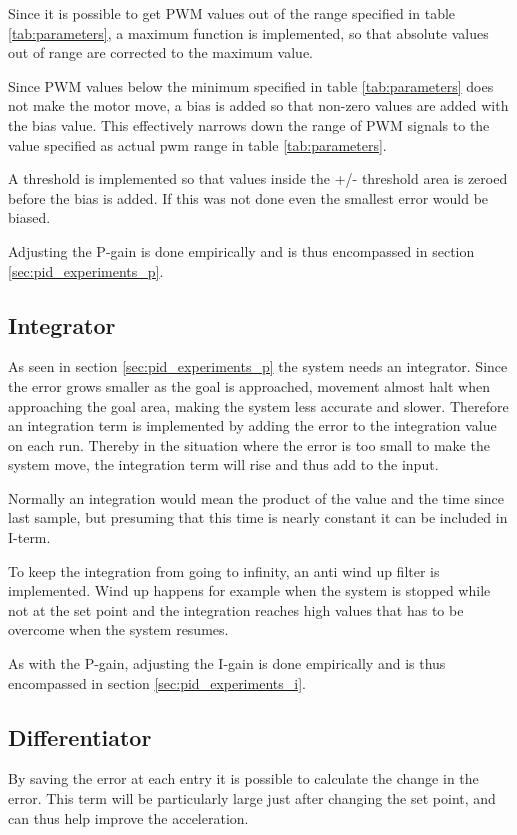 Since it is possible to get PWM values out of the range specified in table \ref{tab:parameters}, a maximum function is implemented, so that absolute values out of range are corrected to the maximum value.

Since PWM values below the minimum specified in table \ref{tab:parameters} does not make the motor move, a bias is added so that non-zero values are added with the bias value. This effectively narrows down the range of PWM signals to the value specified as actual pwm range in table \ref{tab:parameters}. 

A threshold is implemented so that values inside the +/- threshold area is zeroed before the bias is added. If this was not done even the smallest error would be biased.

Adjusting the P-gain is done empirically and is thus encompassed in section \ref{sec:pid_experiments_p}.

\subsection{Integrator}\label{sec:integrator}
As seen in section \ref{sec:pid_experiments_p} the system needs an integrator. Since the error grows smaller as the goal is approached, movement almost halt when approaching the goal area, making the system less accurate and slower. Therefore an integration term is implemented by adding the error to the integration value on each run. Thereby in the situation where the error is too small to make the system move, the integration term will rise and thus add to the input. 

Normally an integration would mean the product of the value and the time since last sample, but presuming that this time is nearly constant it can be included in I-term. 

To keep the integration from going to infinity, an anti wind up filter is implemented. Wind up happens for example when the system is stopped while not at the set point and the integration reaches high values that has to be overcome when the system resumes.

As with the P-gain, adjusting the I-gain is done empirically and is thus encompassed in section \ref{sec:pid_experiments_i}.

\subsection{Differentiator}
By saving the error at each entry it is possible to calculate the change in the error. This term will be particularly large just after changing the set point, and can thus help improve the acceleration. 

